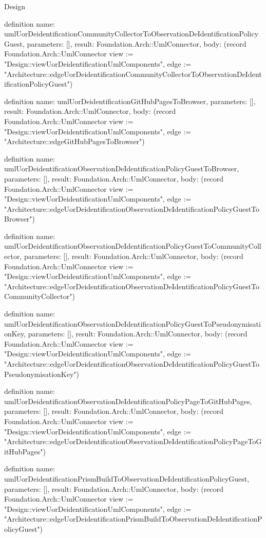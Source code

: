 \begin{lexlean}{Design}
\begin{semanticmodule}
definition{
  name: umlUorDeidentificationCommunityCollectorToObservationDeIdentificationPolicyGuest,
  parameters: [],
  result: Foundation.Arch::UmlConnector,
  body: (record Foundation.Arch::UmlConnector {view := "Design::viewUorDeidentificationUmlComponents", edge := "Architecture::edgeUorDeidentificationCommunityCollectorToObservationDeIdentificationPolicyGuest"})
}

definition{
  name: umlUorDeidentificationGitHubPagesToBrowser,
  parameters: [],
  result: Foundation.Arch::UmlConnector,
  body: (record Foundation.Arch::UmlConnector {view := "Design::viewUorDeidentificationUmlComponents", edge := "Architecture::edgeGitHubPagesToBrowser"})
}

definition{
  name: umlUorDeidentificationObservationDeIdentificationPolicyGuestToBrowser,
  parameters: [],
  result: Foundation.Arch::UmlConnector,
  body: (record Foundation.Arch::UmlConnector {view := "Design::viewUorDeidentificationUmlComponents", edge := "Architecture::edgeUorDeidentificationObservationDeIdentificationPolicyGuestToBrowser"})
}

definition{
  name: umlUorDeidentificationObservationDeIdentificationPolicyGuestToCommunityCollector,
  parameters: [],
  result: Foundation.Arch::UmlConnector,
  body: (record Foundation.Arch::UmlConnector {view := "Design::viewUorDeidentificationUmlComponents", edge := "Architecture::edgeUorDeidentificationObservationDeIdentificationPolicyGuestToCommunityCollector"})
}

definition{
  name: umlUorDeidentificationObservationDeIdentificationPolicyGuestToPseudonymisationKey,
  parameters: [],
  result: Foundation.Arch::UmlConnector,
  body: (record Foundation.Arch::UmlConnector {view := "Design::viewUorDeidentificationUmlComponents", edge := "Architecture::edgeUorDeidentificationObservationDeIdentificationPolicyGuestToPseudonymisationKey"})
}

definition{
  name: umlUorDeidentificationObservationDeIdentificationPolicyPageToGitHubPages,
  parameters: [],
  result: Foundation.Arch::UmlConnector,
  body: (record Foundation.Arch::UmlConnector {view := "Design::viewUorDeidentificationUmlComponents", edge := "Architecture::edgeUorDeidentificationObservationDeIdentificationPolicyPageToGitHubPages"})
}

definition{
  name: umlUorDeidentificationPrismBuildToObservationDeIdentificationPolicyGuest,
  parameters: [],
  result: Foundation.Arch::UmlConnector,
  body: (record Foundation.Arch::UmlConnector {view := "Design::viewUorDeidentificationUmlComponents", edge := "Architecture::edgeUorDeidentificationPrismBuildToObservationDeIdentificationPolicyGuest"})
}


\end{semanticmodule}
\end{lexlean}
